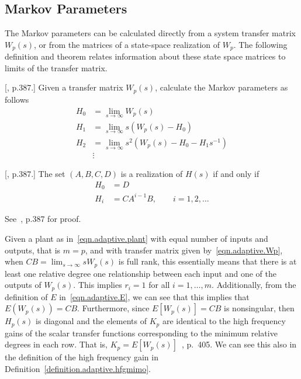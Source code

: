 \subsection{Markov Parameters}

The Markov parameters can be calculated directly from a system transfer matrix $W_{p}(s)$, or from the matrices of a state-space realization of $W_{p}$.
The following definition and theorem relates information about these state space matrices to limits of the transfer matrix.

\begin{defn-dan}\label{definition.adaptive.markov}
  [\cite{antsaklis.linearsystems.2006}, p.387.]
  Given a transfer matrix $W_{p}(s)$, calculate the Markov parameters as follows
  \begin{align*}
    H_{0}&=\lim_{s\rightarrow\infty}W_{p}(s) \\
    H_{1}&=\lim_{s\rightarrow\infty}s(W_{p}(s)-H_{0}) \\
    H_{2}&=\lim_{s\rightarrow\infty}s^{2}(W_{p}(s)-H_{0}-H_{1}s^{-1}) \\
    &\vdots
  \end{align*}
\end{defn-dan}

\begin{thm-dan}\label{thm.markov_realization}
  [\cite{antsaklis.linearsystems.2006}, p.387.]
  The set $(A,B,C,D)$ is a realization of $H(s)$ if and only if
  \begin{align*}
    H_{0}&=D \\
    H_{i}&=CA^{i-1}B, \qquad i=1,2,\dots
  \end{align*}
\end{thm-dan}

\begin{proof-dan}
  See~\cite{antsaklis.linearsystems.2006}, p.387 for proof.
\end{proof-dan}

\begin{rem-dan}
  Given a plant as in~\eqref{eqn.adaptive.plant} with equal number of inputs and outputs, that is $m=p$, and with transfer matrix given by~\eqref{eqn.adaptive.Wp}, when $CB=\lim_{s\rightarrow\infty}sW_{p}(s)$ is full rank, this essentially means that there is at least one relative degree one relationship between each input and one of the outputs of $W_{p}(s)$.
  This implies $r_{i}=1$ for all $i=1,\dots,m$.
  Additionally, from the definition of $E$ in~\eqref{eqn.adaptive.E}, we can see that this implies that $E(W_{p}(s))=CB$.
  Furthermore, since $E[W_{p}(s)]=CB$ is nonsingular, then $H_{p}(s)$ is diagonal and the elements of $K_{p}$ are identical to the high frequency gains of the scalar transfer functions corresponding to the minimum relative degrees in each row.
  That is, $K_{p}=E[W_{p}(s)]$~\cite{narendra.stable.2005}, p.~405.
  We can see this also in the definition of the high frequency gain in Definition~\ref{definition.adaptive.hfgmimo}.
\end{rem-dan}


